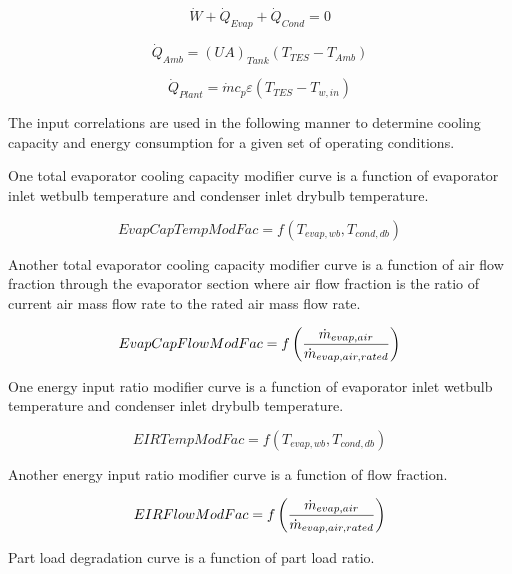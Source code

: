 \begin{equation}
\dot W + {\dot Q_{Evap}} + {\dot Q_{Cond}} = 0
\end{equation}

\begin{equation}
{\dot Q_{Amb}} = {\left( {UA} \right)_{Tank}}\left( {{T_{TES}} - {T_{Amb}}} \right)
\end{equation}

\begin{equation}
{\dot Q_{Plant}} = \dot m{c_p}\varepsilon \left( {{T_{TES}} - {T_{w,in}}} \right)
\end{equation}

The input correlations are used in the following manner to determine cooling capacity and energy consumption for a given set of operating conditions.

One total evaporator cooling capacity modifier curve is a function of evaporator inlet wetbulb temperature and condenser inlet drybulb temperature.

\begin{equation}
EvapCapTempModFac = {f_{}}\left( {{T_{evap,wb}},{\mathrm{}}{T_{cond,db}}} \right)
\end{equation}

Another total evaporator cooling capacity modifier curve is a function of air flow fraction through the evaporator section where air flow fraction is the ratio of current air mass flow rate to the rated air mass flow rate.

\begin{equation}
  EvapCapFlowModFac = f\left(\frac{\dot{m}_{evap,air}}{\dot{m}_{evap,air,rated}}\right)
\end{equation}

One energy input ratio modifier curve is a function of evaporator inlet wetbulb temperature and condenser inlet drybulb temperature.

\begin{equation}
EIRTempModFac = f\left( {{T_{evap,wb}},{\mathrm{}}{T_{cond,db}}} \right)
\end{equation}

Another energy input ratio modifier curve is a function of flow fraction.

\begin{equation}
  EIRFlowModFac = f\left(\frac{\dot{m}_{evap,air}}{\dot{m}_{evap,air,rated}}\right)
\end{equation}

Part load degradation curve is a function of part load ratio.

